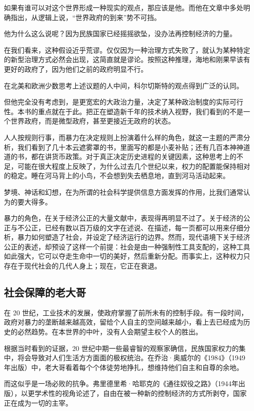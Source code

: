 如果有谁可以对这个世界形成一种现实的观点，那应该是他。而他在文章中多处明确指出，从逻辑上说，“世界政府的到来”势不可挡。


他为什么这么说呢？因为民族国家已经摇摇欲坠，没办法再控制经济的力量。


在我们看来，这种假设近乎荒谬。仅仅因为一种治理方式失败了，就认为某种特定的新型治理方式必然会出现，这简直就是谬论。按照这种推理，海地和刚果早该有更好的政府了，因为他们之前的政府明显不行。


在北美和欧洲少数思考上述议题的人中间，科尔切斯特的观点得到广泛的认同。


但他完全没有考虑到，是更宽宏的大政治力量，决定了某种政治制度的实际可行性。本书的重点就在于此。把正在塑造新千年的技术纳入视野，我们看到的不是一个世界政府，而是微型政府，甚至更接近无政府的状态。


人人按规则行事，而暴力在决定规则上扮演着什么样的角色，就这一主题的严肃分析，我们看到了几十本云遮雾罩的书，里面写的都是小麦补贴；还有几百本神神道道的书，都在讲货币政策。对于真正决定历史进程的关键因素，这种思考上的不足，可能在很大程度上反映了，为什么过去几个世纪以来，权力的配置能保持相对的稳定。睡在河马背上的小鸟，不会想到失去栖息地，直到河马活动起来。


梦境、神话和幻想，在为所谓的社会科学提供信息方面发挥的作用，比我们通常认为的要大得多。


暴力的角色，在关于经济公正的大量文献中，表现得再明显不过了。关于经济的公正与不公正，已经有数以百万级的文字在述说、在描述，每一页都可以用来仔细分析，暴力如何塑造了社会，并设定了经济运行的边界。然而，现代语境下关于经济公正的表述，却预设了这样一个前提：社会是由一种强制性工具支配的，这种工具如此强大，它可以夺走生命中一切的美好，然后重新分配。而事实上，这种权力只存在于现代社会的几代人身上；现在，它正在衰退。


\subsection{社会保障的老大哥}
在 20 世纪，工业技术的发展，使政府掌握了前所未有的控制手段。有一段时间，政府对暴力的垄断越来越高效，留给个人自主的空间越来越小，看上去已经成为历史的必然趋势。在本世界的中叶，没有人会期望主权个人的胜出。


根据当时看到的证据，20 世纪中期一些最睿智的观察家确信，民族国家权力的集中，将会导致对人们生活方方面面的极权统治。在乔治·奥威尔的《1984》（1949年出版）中，老大哥看着每个个体徒劳地挣扎，想维持他们自主和自尊的余地。


而这似乎是一场必败的抗争。弗里德里希·哈耶克的《通往奴役之路》（1944年出版），以更学术性的视角论述了，自由在被一种新的控制经济的方式所剥夺，国家正在成为一切的主宰。


